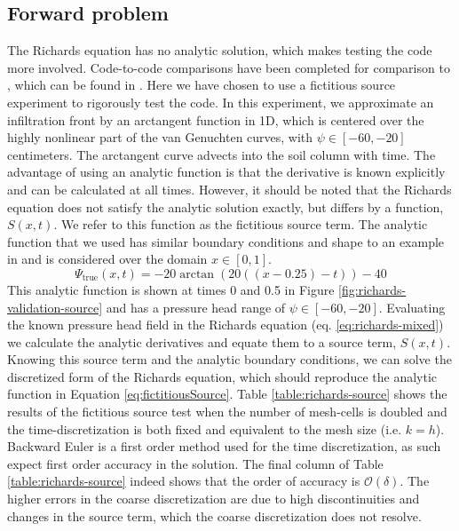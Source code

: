 \documentclass[preprint,review,3p,times,onecolumn,authoryear]{elsarticle}
\begin{document}
\subsection{Forward problem}
The Richards equation has no analytic solution, which makes testing the code more involved. Code-to-code comparisons have been completed for comparison to \cite{Celia1990}, which can be found in \cite{richardsceliacomparison}. Here we have chosen to use a fictitious source experiment to rigorously test the code. In this experiment, we approximate an infiltration front by an arctangent function in 1D, which is centered over the highly nonlinear part of the van Genuchten curves, with $\psi\in[-60,-20]$ centimeters. The arctangent curve advects into the soil column with time. The advantage of using an analytic function is that the derivative is known explicitly and can be calculated at all times. However, it should be noted that the Richards equation does not satisfy the analytic solution exactly, but differs by a function, $S(x,t)$. We refer to this function as the fictitious source term. The analytic function that we used has similar boundary conditions and shape to an example in \cite{Celia1990} and is considered over the domain $x\in[0, 1]$.
\begin{equation}
\label{eq:fictitiousSource}
    \Psi_{\text{true}}(x,t)=-20\arctan(20((x-0.25)-t))-40
\end{equation}
This analytic function is shown at times 0 and 0.5 in Figure \ref{fig:richards-validation-source} and has a pressure head range of $\psi\in[-60,-20]$. Evaluating the known pressure head field in the Richards equation (eq. \ref{eq:richards-mixed}) we calculate the analytic derivatives and equate them to a source term, $S(x,t)$. Knowing this source term and the analytic boundary conditions, we can solve the discretized form of the Richards equation, which should reproduce the analytic function in Equation \ref{eq:fictitiousSource}. Table \ref{table:richards-source} shows the results of the fictitious source test when the number of mesh-cells is doubled and the time-discretization is both fixed and equivalent to the mesh size (i.e. $k=h$). Backward Euler is a first order method used for the time discretization, as such expect first order accuracy in the solution. The final column of Table \ref{table:richards-source} indeed shows that the order of accuracy is $\mathcal{O}(\delta)$. The higher errors in the coarse discretization are due to high discontinuities and changes in the source term, which the coarse discretization does not resolve.
\end{document}
